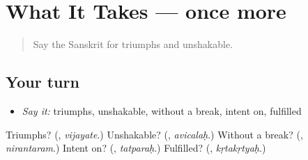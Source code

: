 \section[(dialogue)]{What It Takes — once more}

\label{lesson:SA-R393-review-final-393}



\begin{quote}
Say the Sanskrit for triumphs and unshakable.
\end{quote}

\subsection*{Your turn}
\begin{itemize}
\raggedright
  \item \emph{Say it:} triumphs, unshakable, without a break, intent on, fulfilled
\end{itemize}

\begin{tcolorbox}[breakable,colback=teal!4,colframe=teal!35!black,title={Before you move on}]
Triumphs? (\textbf{}, \emph{vijayate}.) Unshakable? (\textbf{}, \emph{avicalaḥ}.) Without a break? (\textbf{}, \emph{nirantaram}.) Intent on? (\textbf{}, \emph{tatparaḥ}.) Fulfilled? (\textbf{}, \emph{kṛtakṛtyaḥ}.)
\end{tcolorbox}
